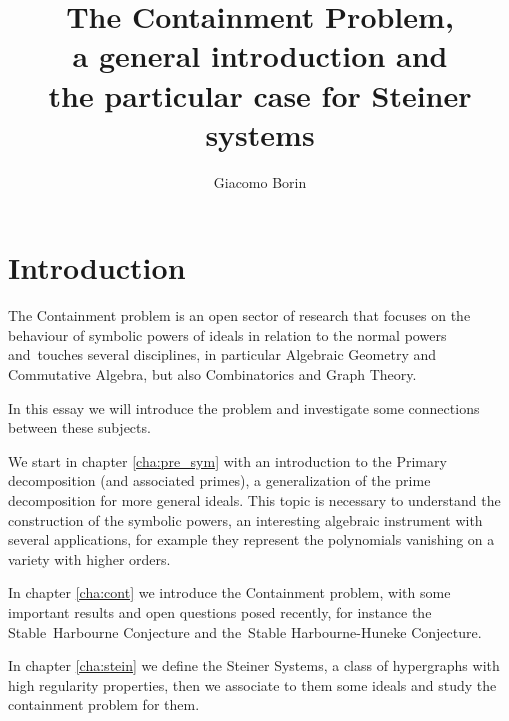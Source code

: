 \documentclass[notitlepage, a4]{book}
\title{The Containment Problem, 
\\a general introduction and 
\\the particular case for Steiner systems}
\author{Giacomo Borin}
\theoremstyle{plain}
\theoremstyle{remark}
\theoremstyle{definition}
\newcounter{que}
\begin{document}
\frontmatter

\pagestyle{fancy}
\fancyhf{}

\renewcommand{\headrulewidth}{1.5pt}
\renewcommand{\footrulewidth}{1.5pt}


%

\thispagestyle{empty}
\newpage

\renewcommand{\headrulewidth}{1pt}
\renewcommand{\footrulewidth}{0pt}
\renewcommand{\chaptermark}[1]{\markboth{#1}{}}
\rhead{\leftmark}
\rfoot{\thepage}

\tableofcontents
\newpage
%
%

\section*{Introduction}
The Containment problem is an open sector of research that focuses on the behaviour of symbolic powers of ideals in relation to the normal powers and touches several disciplines, in particular Algebraic Geometry and Commutative Algebra, but also Combinatorics and Graph Theory. 

In this essay we will introduce the problem and investigate some connections between these subjects. 

We start in chapter \ref{cha:pre_sym} with an introduction to the Primary decomposition (and associated primes), a generalization of the prime decomposition for more general ideals. This topic is necessary to understand the construction of the symbolic powers, an interesting algebraic instrument with several applications, for example they represent the polynomials vanishing on a variety with higher orders. 

In chapter \ref{cha:cont} we introduce the Containment problem, with some important results and open questions posed recently, for instance the Stable Harbourne Conjecture and the Stable Harbourne-Huneke Conjecture. 

In chapter \ref{cha:stein} we define the Steiner Systems, a class of hypergraphs with high regularity properties, then we associate to them some ideals and study the containment problem for them. 
\end{document}
